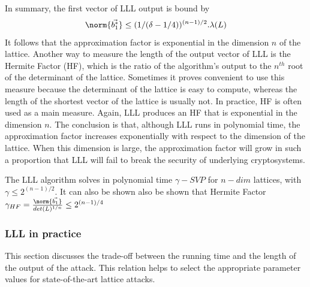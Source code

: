
In summary, the first vector of LLL output is bound by
\[
  \norm{\vec{b_1^*}} \leq (1/(\delta-1/4))^{(n-1)/2}.\lambda(L)
\]
It follows that the approximation factor is exponential in the dimension $n$ of
the lattice. Another way to measure the length of the output vector of LLL is the Hermite
Factor (HF), which is the ratio of the algorithm's output to the $n^{th}$ root
of the determinant of the lattice. Sometimes it proves convenient to use this
measure because the determinant of the lattice is easy to compute,
whereas the length of the shortest vector of the lattice is usually not. In
practice, HF is often used as a main measure. Again, LLL produces an HF that is
exponential in the dimension $n$. The conclusion is that, although LLL runs in
polynomial time, the approximation factor increases exponentially with respect to
the dimension of the lattice. When this dimension is large, the approximation factor will grow
in such a proportion that LLL will fail to break the security of underlying
cryptosystems.
\begin{theorem}
  The LLL algorithm solves in polynomial time $\gamma-SVP$ for $n-dim$ lattices,
  with $\gamma \leq 2^{(n-1)/2}$. It can also be shown also be shown that Hermite Factor
  $\gamma_{HF} = \frac{\norm{\vec{b_1}}}{det(L)^{1/n}} \leq 2^{(n-1)/4}$
  \label{theo:LLLHF}
\end{theorem}

\subsubsection{LLL in practice}
\label{sec:LLLinPractice}
This section discusses the trade-off between the running time and the length of
the output of the attack. This relation helps to select the appropriate parameter values for
state-of-the-art lattice attacks.

